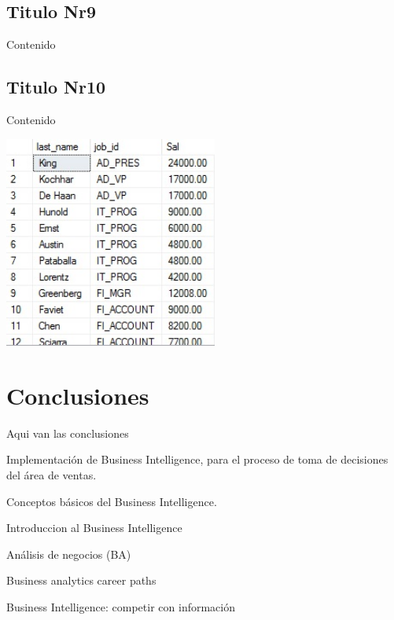\documentclass[twoside,twocolumn]{article}
\begin{document}
\subsection{Titulo Nr9}
Contenido 



\subsection{Titulo Nr10}
Contenido 

\begin{center}
	\includegraphics[width=7cm]{./Imagenes/img} 
\end{center}


\section{Conclusiones}

Aqui van las conclusiones




\begin{thebibliography}{99} 

\newblock Implementación de Business Intelligence, para el proceso de toma de decisiones del área de ventas.

Conceptos básicos del Business Intelligence.

\newblock Introduccion al Business Intelligence

\newblock Análisis de negocios (BA)

\newblock Business analytics career paths

\newblock Business Intelligence: competir con información
 

 
\end{thebibliography}


\end{document}
